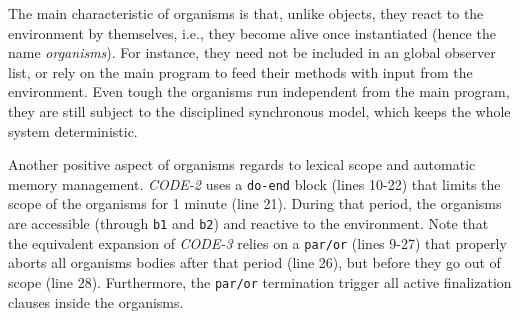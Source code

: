 \documentclass{acm_proc_article-sp}
\newcommand{\CEU}{\textsc{C\'{e}u}\xspace}
\newcommand{\code}[1] {{\small{\texttt{#1}}}}
\newcommand{\1}{\;}
\newcommand{\2}{\;\;}
\newcommand{\3}{\;\;\;}
\newcommand{\5}{\;\;\;\;\;}
\begin{document}
The main characteristic of organisms is that, unlike objects, they react to the 
environment by themselves, i.e., they become alive once instantiated (hence the 
name \emph{organisms}).
%
For instance, they need not be included in an global observer list, or rely on 
the main program to feed their methods with input from the environment.
%
Even tough the organisms run independent from the main program, they are still 
subject to the disciplined synchronous model, which keeps the whole system 
deterministic.
%

Another positive aspect of organisms regards to lexical scope and automatic 
memory management.
%
\emph{CODE-2} uses a \code{do-end} block (lines 10-22) that limits the scope of 
the organisms for 1 minute (line 21).
%
During that period, the organisms are accessible (through \code{b1} and 
\code{b2}) and reactive to the environment.
%
Note that the equivalent expansion of \emph{CODE-3} relies on a \code{par/or} 
(lines 9-27) that properly aborts all organisms bodies after that period (line 
26), but before they go out of scope (line 28).
%
Furthermore, the \code{par/or} termination trigger all active finalization 
clauses inside the organisms.
\end{document}
